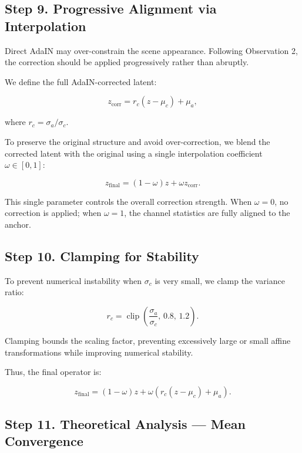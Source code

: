 \documentclass[12pt]{article}
\DeclareMathOperator{\clip}{clip}
\begin{document}
\subsection{Step 9. Progressive Alignment via Interpolation}

Direct AdaIN may over-constrain the scene appearance. Following Observation 2, the correction should be applied progressively rather than abruptly.

We define the full AdaIN-corrected latent:

\begin{equation}
z_{\mathrm{corr}} = r_c(z - \mu_c) + \mu_a,
\end{equation}

where $r_c = \sigma_a / \sigma_c$.

To preserve the original structure and avoid over-correction, we blend the corrected latent with the original using a single interpolation coefficient $\omega \in [0, 1]$:

\begin{equation}
z_{\mathrm{final}} = (1 - \omega) z + \omega z_{\mathrm{corr}}.
\end{equation}

This single parameter controls the overall correction strength. When $\omega = 0$, no correction is applied; when $\omega = 1$, the channel statistics are fully aligned to the anchor.

\subsection{Step 10. Clamping for Stability}

To prevent numerical instability when $\sigma_c$ is very small, we clamp the variance ratio:

\begin{equation}
r_c = \clip\left( \frac{\sigma_a}{\sigma_c},\, 0.8,\, 1.2 \right).
\end{equation}

Clamping bounds the scaling factor, preventing excessively large or small affine transformations while improving numerical stability.

Thus, the final operator is:

\begin{equation}
\boxed{z_{\mathrm{final}} = (1-\omega) z + \omega \left( r_c(z - \mu_c) + \mu_a \right)}.
\end{equation}

\subsection{Step 11. Theoretical Analysis — Mean Convergence}
\end{document}
